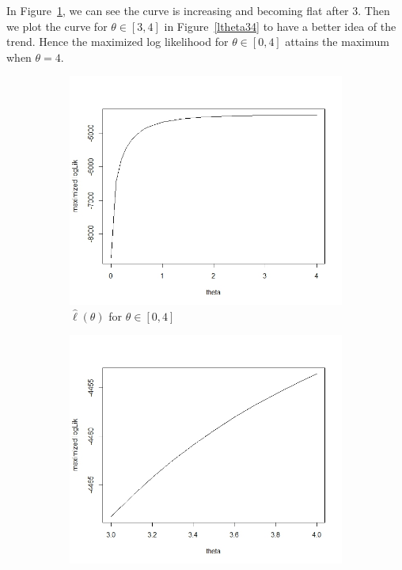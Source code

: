 \documentclass{article}
\begin{document}
\begin{enumerate}[leftmargin = 0 em, label = \arabic*., font = \bfseries]
\begin{enumerate}
\begin{enumerate}
	 In Figure~\ref{ltheta04}, we can see the curve is increasing and becoming flat after 3. Then we plot the curve for $\theta \in [3,4]$ in Figure~\ref{ltheta34} to have a better idea of the trend. Hence the maximized log likelihood for $\theta \in [0,4]$ attains the maximum when $\theta = 4$.  
	 \begin{figure}[!htb]
	     \centering
	 	\begin{subfigure}[b]{0.4\textwidth}
	 	\includegraphics[width = \textwidth]{ltheta04.jpeg}
	 	\caption{$\hat{\ell}(\theta)$ for $\theta \in [0,4]$}
	 	\label{ltheta04}
	 	\end{subfigure}%
	 	\begin{subfigure}[b]{0.4\textwidth}
	 	\includegraphics[width = \textwidth]{ltheta34.jpeg}

\end{subfigure}
\end{figure}
\end{enumerate}
\end{enumerate}
\end{enumerate}
\end{document}
